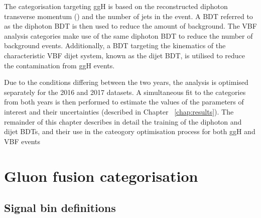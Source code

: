 The categorisation targeting ggH is based on the reconstructed diphoton transverse momentum (\ptgg) 
and the number of jets in the event. 
A BDT referred to as the diphoton BDT is then used to reduce the amount of background. 
The VBF analysis categories make use of the same diphoton BDT 
to reduce the number of background events. 
Additionally, a BDT targeting the kinematics of the characteristic VBF dijet system, 
known as the dijet BDT, is utilised to reduce the contamination from ggH events.

Due to the conditions differing between the two years, 
the analysis is optimised separately for the 2016 and 2017 datasets. 
A simultaneous fit to the categories from both years is then performed to estimate the 
values of the parameters of interest and their uncertainties (described in Chapter ~\ref{chap:results}).
The remainder of this chapter describes in detail the training of the diphoton and dijet BDTs, 
and their use in the cateogory optimisation process for both ggH and VBF events

\section{Gluon fusion categorisation}
\subsection{Signal bin definitions}

